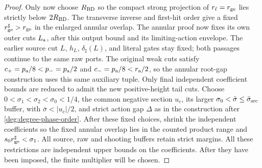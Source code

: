 \begin{proof}
Only now choose $R_{\rm BD}$ so the compact strong projection of
$r_\ell=r_{\rm ge}$ lies strictly below $2R_{\rm BD}$.
The transverse inverse and first-hit order give a fixed
$r_{\rm ge}^{\sharp}>r_{\rm ge}$ in the enlarged annular overlap.
The annular proof now fixes its own outer cuts \(L_{\rm a}\), after
this output bound and its limiting-action envelope. The earlier source
cut \(L\), \(h_L\), \(\delta_\sharp(L)\), and literal gates stay fixed;
both passages continue to the same raw ports. The original weak cuts
satisfy \(c_+=p_{\rm a}/8<p_-=p_{\rm a}/2\) and
\(c_-=p_{\rm a}/8<r_{\rm a}/2\), so the annular root-gap construction
uses this same auxiliary tuple. Only final independent coefficient bounds
are reduced to admit the new positive-height tail cuts.
Choose $0<\sigma_1<\sigma_2<\sigma_0<1/4$, the common
negative section $u_c$, its larger
$\sigma_0<\bar\sigma\le\bar\sigma_{\rm src}$ buffer, with
$\bar\sigma<|u_c|/2$, and strict
action gap $\Delta$ as in the construction after
\eqref{deg:degree-phase-order}. After these fixed choices, shrink
the independent coefficients so the fixed annular overlap lies in
the counted product range and $s_0r_{\rm ge}^{\sharp}<\sigma_1$.
All source, raw and shooting buffers retain strict margins.
All these restrictions are independent upper bounds on the coefficients.
After they have been imposed, the finite multiplier will be chosen.
\end{proof}

